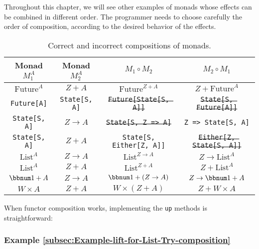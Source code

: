 Throughout this chapter, we will see other examples of monads whose
effects can be combined in different order. The programmer needs to
choose carefully the order of composition, according to the desired
behavior of the effects.
\begin{center}
\begin{table}[h]
\begin{centering}
\begin{tabular}{|c|c|c|c|}
\hline 
\textbf{\small{}Monad $M_{1}^{A}$} & \textbf{\small{}Monad $M_{2}^{A}$} & \textbf{\small{}$M_{1}\circ M_{2}$} & \textbf{\small{}$M_{2}\circ M_{1}$}\tabularnewline
\hline 
\hline 
{\small{}$\text{Future}^{A}$} & {\small{}$Z+A$} & {\small{}$\text{Future}^{Z+A}$} & {\small{}\sout{\mbox{$Z+\text{Future}^{A}$}}}\tabularnewline
\hline 
\texttt{\small{}Future{[}A{]}} & \texttt{\small{}State{[}S, A{]}} & \texttt{\small{}\sout{Future{[}State{[}S, A{]}{]}}} & \texttt{\small{}\sout{State{[}S, Future{[}A{]}{]}}}\tabularnewline
\hline 
\texttt{\small{}State{[}S, A{]}} & {\small{}$Z\rightarrow A$} & \texttt{\small{}\sout{State{[}S, Z => A{]}}} & \texttt{\small{}Z => State{[}S, A{]}}\tabularnewline
\hline 
\texttt{\small{}State{[}S, A{]}} & {\small{}$Z+A$} & \texttt{\small{}State{[}S, Either{[}Z, A{]}{]}} & \texttt{\small{}\sout{Either{[}Z, State{[}S, A{]}{]}}}\tabularnewline
\hline 
{\small{}$\text{List}^{A}$} & {\small{}$Z\rightarrow A$} & {\small{}\sout{\mbox{$\text{List}^{Z\rightarrow A}$}}} & {\small{}$Z\rightarrow\text{List}^{A}$}\tabularnewline
\hline 
{\small{}$\text{List}^{A}$} & {\small{}$Z+A$} & {\small{}$\text{List}^{Z+A}$} & {\small{}\sout{\mbox{$Z+\text{List}^{A}$}}}\tabularnewline
\hline 
{\small{}$\bbnum 1+A$} & {\small{}$Z\rightarrow A$} & {\small{}\sout{\mbox{$\bbnum 1+\left(Z\rightarrow A\right)$}}} & {\small{}$Z\rightarrow\bbnum 1+A$}\tabularnewline
\hline 
{\small{}$W\times A$} & {\small{}$Z+A$} & {\small{}$W\times\left(Z+A\right)$} & {\small{}$Z+W\times A$}\tabularnewline
\hline 
\end{tabular}
\par\end{centering}
\caption{\label{tab:Correct-and-incorrect-compositions}Correct and incorrect
compositions of monads.}
\end{table}
\par\end{center}

When functor composition works, implementing the \lstinline!up! methods
is straightforward:

\subsubsection{Example \label{subsec:Example-lift-for-List-Try-composition}\ref{subsec:Example-lift-for-List-Try-composition}}

